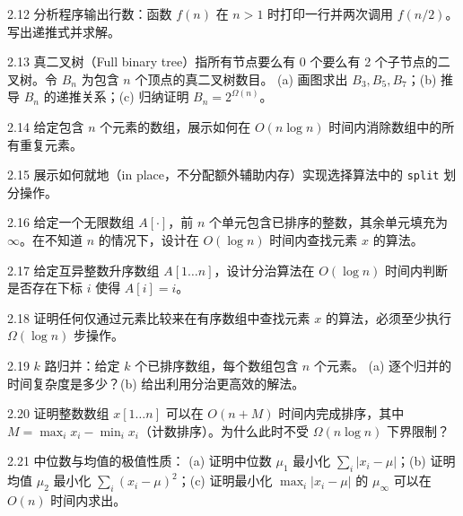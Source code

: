 \begin{exercise}{2.12}
分析程序输出行数：函数 $f(n)$ 在 $n > 1$ 时打印一行并两次调用 $f(n/2)$。写出递推式并求解。
\end{exercise}

\begin{exercise}{2.13}
真二叉树（Full binary tree）指所有节点要么有 0 个要么有 2 个子节点的二叉树。令 $B_n$ 为包含 $n$ 个顶点的真二叉树数目。
(a) 画图求出 $B_3, B_5, B_7$；(b) 推导 $B_n$ 的递推关系；(c) 归纳证明 $B_n = 2^{\Omega(n)}$。
\end{exercise}

\begin{exercise}{2.14}
给定包含 $n$ 个元素的数组，展示如何在 $O(n \log n)$ 时间内消除数组中的所有重复元素。
\end{exercise}

\begin{exercise}{2.15}
展示如何就地（in place，不分配额外辅助内存）实现选择算法中的 \texttt{split} 划分操作。
\end{exercise}

\begin{exercise}{2.16}
给定一个无限数组 $A[\cdot]$，前 $n$ 个单元包含已排序的整数，其余单元填充为 $\infty$。在不知道 $n$ 的情况下，设计在 $O(\log n)$ 时间内查找元素 $x$ 的算法。
\end{exercise}

\begin{exercise}{2.17}
给定互异整数升序数组 $A[1 \dots n]$，设计分治算法在 $O(\log n)$ 时间内判断是否存在下标 $i$ 使得 $A[i] = i$。
\end{exercise}

\begin{exercise}{2.18}
证明任何仅通过元素比较来在有序数组中查找元素 $x$ 的算法，必须至少执行 $\Omega(\log n)$ 步操作。
\end{exercise}

\begin{exercise}{2.19}
$k$ 路归并：给定 $k$ 个已排序数组，每个数组包含 $n$ 个元素。
(a) 逐个归并的时间复杂度是多少？(b) 给出利用分治更高效的解法。
\end{exercise}

\begin{exercise}{2.20}
证明整数数组 $x[1 \dots n]$ 可以在 $O(n + M)$ 时间内完成排序，其中 $M = \max_i x_i - \min_i x_i$（计数排序）。为什么此时不受 $\Omega(n \log n)$ 下界限制？
\end{exercise}

\begin{exercise}{2.21}
中位数与均值的极值性质：
(a) 证明中位数 $\mu_1$ 最小化 $\sum_i |x_i - \mu|$；(b) 证明均值 $\mu_2$ 最小化 $\sum_i (x_i - \mu)^2$；(c) 证明最小化 $\max_i |x_i - \mu|$ 的 $\mu_\infty$ 可以在 $O(n)$ 时间内求出。
\end{exercise}

